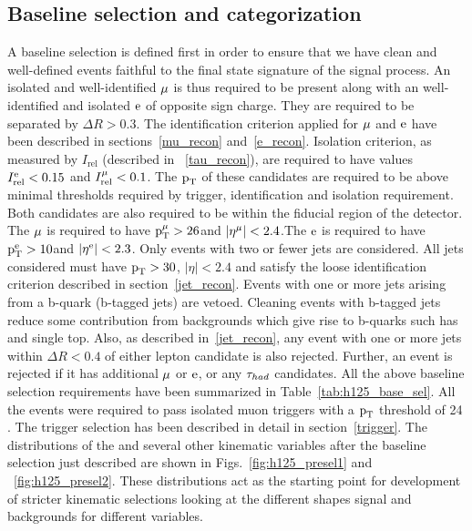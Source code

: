 \subsection{Baseline selection and categorization}
\label{h125_presel_cat}
A baseline selection is defined first in order to ensure that we have clean and well-defined events faithful to the final state signature of the signal process. An isolated and well-identified $\mu$ is thus required to be present along with an well-identified and isolated $\text{e}$ of opposite sign charge. They are required to be separated by $\Delta R > 0.3$. The identification criterion applied for $\mu$ and $\text{e}$ have been described in sections~\ref{mu_recon} and~\ref{e_recon}. Isolation criterion, as measured by $I_\text{rel}$ (described in ~\ref{tau_recon}), are required to have values $I_\text{rel}^{\text{e}} < 0.15$ and $I_\text{rel}^{\mu} < 0.1$. The $\text{p}_\text{T}$ of these candidates are required to be above minimal thresholds required by trigger, identification and isolation requirement. Both candidates are also required to be within the fiducial region of the detector. The $\mu$ is required to have $\text{p}_\text{T}^{\mu} > 26$\GeV and $|\eta^{\mu}|<2.4$.The $\text{e}$ is required to have $\text{p}_\text{T}^{\text{e}} > 10$\GeV and $|\eta^{\text{e}}|<2.3$. Only events with two or fewer jets are considered. All jets considered must have $\text{p}_\text{T}>30$\GeV, $|\eta| < 2.4 $ and satisfy the loose identification criterion described in section~\ref{jet_recon}. Events with one or more jets arising from a b-quark (b-tagged jets) are vetoed. Cleaning events with b-tagged jets reduce some contribution from backgrounds which give rise to b-quarks such has \ttb and single top. Also, as described in~\ref{jet_recon}, any event with one or more jets within $\Delta R < 0.4$ of either lepton candidate is also rejected. Further, an event is rejected if it has additional $\mu$ or $\text{e}$, or any $\tau_{had}$ candidates. All the above baseline selection requirements have been summarized in Table~\ref{tab:h125_base_sel}. All the events were required to pass isolated muon triggers with a $\text{p}_\text{T}$ threshold of 24 \GeV. The trigger selection has been described in detail in section~\ref{trigger}. The distributions of the \mcol and several other kinematic variables after the baseline selection just described are shown in Figs.~\ref{fig:h125_presel1} and ~\ref{fig:h125_presel2}. These distributions act as the starting point for development of stricter kinematic selections looking at the different shapes signal and backgrounds for different variables.     


